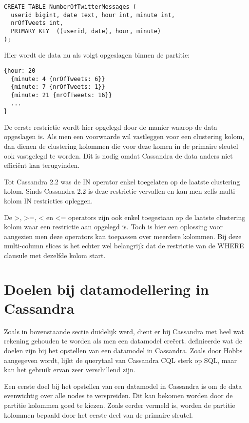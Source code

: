 \begin{lstlisting}
CREATE TABLE NumberOfTwitterMessages (
  userid bigint, date text, hour int, minute int,
  nrOfTweets int,
  PRIMARY KEY  ((userid, date), hour, minute)
);
\end{lstlisting}

Hier wordt de data nu als volgt opgeslagen binnen de partitie: 

\begin{lstlisting}
{hour: 20 
  {minute: 4 {nrOfTweets: 6}} 
  {minute: 7 {nrOfTweets: 1}}
  {minute: 21 {nrOfTweets: 16}}
  ...
}
\end{lstlisting}

De eerste restrictie wordt hier opgelegd door de manier waarop de data opgeslagen is.
Als men een voorwaarde wil vastleggen voor een clustering kolom, dan dienen de clustering kolommen die voor deze komen in de primaire sleutel ook vastgelegd te worden.
Dit is nodig omdat Cassandra de data anders niet efficiënt kan terugvinden.

Tot Cassandra 2.2 was de IN operator enkel toegelaten op de laatste clustering kolom.
Sinds Cassandra 2.2 is deze restrictie vervallen en kan men zelfs multi-kolom IN restricties opleggen.

De >, >=, < en <= operators zijn ook enkel toegestaan op de laatste clustering kolom waar een restrictie aan opgelegd is.
Toch is hier een oplossing voor aangezien men deze operators kan toepassen over meerdere kolommen.
Bij deze multi-column slices is het echter wel belangrijk dat de restrictie van de WHERE clausule met dezelfde kolom start.


\section{Doelen bij datamodellering in Cassandra}
Zoals in bovenstaande sectie duidelijk werd, dient er bij Cassandra met heel wat rekening gehouden te worden als men een datamodel creëert.
\cite{Hobbs2015Datamodelling} definieerde wat de doelen zijn bij het opstellen van een datamodel in Cassandra.
Zoals door Hobbs aangegeven wordt, lijkt de querytaal van Cassandra CQL sterk op SQL, maar kan het gebruik ervan zeer verschillend zijn.

Een eerste doel bij het opstellen van een datamodel in Cassandra is om de data evenwichtig over alle nodes te verspreiden.
Dit kan bekomen worden door de partitie kolommen goed te kiezen.
Zoals eerder vermeld is, worden de partitie kolommen bepaald door het eerste deel van de primaire sleutel.

